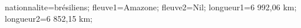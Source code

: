 \documentclass[exercice]{thedocument}%
\begin{document}
%
\>nationnalite=brésiliens;%
\>fleuve1=Amazone;%
\>fleuve2=Nil;%
\>longueur1=6 992,06 km;%
\>longueur2=6 852,15 km;%
%
\end{document}
